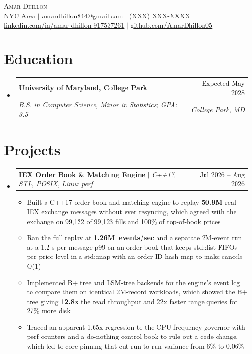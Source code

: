 \documentclass[letterpaper,10pt]{article}
\makeatletter
\newcommand{\resumeItem}[1]{\item{#1}\vspace{-1pt}}
\newcommand{\resumeSubheading}[4]{%
  \vspace{-1pt}\item
  \begin{tabular*}{\textwidth}[t]{l@{\extracolsep{\fill}}r}
    \textbf{#1} & #2 \\
    \textit{#3} & \textit{#4} \\
  \end{tabular*}\vspace{-6pt}%
}
\newcommand{\resumeProjectHeading}[2]{%
  \item
  \begin{tabular*}{\textwidth}{l@{\extracolsep{\fill}}r}
    #1 & #2 \\
  \end{tabular*}\vspace{-6pt}%
}
\newcommand{\resumeSubHeadingListStart}{\begin{itemize}[leftmargin=0in, label={}, itemsep=0pt, topsep=2pt]}
\newcommand{\resumeSubHeadingListEnd}{\end{itemize}}
\newcommand{\resumeItemListStart}{\begin{itemize}[leftmargin=0.18in, itemsep=0pt, topsep=1pt, parsep=0pt]}
\newcommand{\resumeItemListEnd}{\end{itemize}\vspace{0pt}}
\makeatother
\begin{document}
\begin{center}
  {\Huge\scshape\textcolor{accent}{Amar Dhillon}} \\ \vspace{3pt}
  \footnotesize
  NYC Area $|$
  \href{mailto:amardhillon844@gmail.com}{\underline{amardhillon844@gmail.com}} $|$
  (XXX) XXX-XXXX $|$
  \href{https://linkedin.com/in/amar-dhillon-917537261}{\underline{linkedin.com/in/amar-dhillon-917537261}} $|$
  \href{https://github.com/AmarDhillon05}{\underline{github.com/AmarDhillon05}}
\end{center}
\vspace{-6pt}

\section{Education}
\resumeSubHeadingListStart
  \resumeSubheading
    {University of Maryland, College Park}{Expected May 2028}
    {B.S. in Computer Science, Minor in Statistics; GPA: 3.5}{College Park, MD}
\resumeSubHeadingListEnd

\section{Projects}
\resumeSubHeadingListStart
  \resumeProjectHeading
    {\textbf{IEX Order Book \& Matching Engine} $|$ \textit{C++17, STL, POSIX, Linux perf}}{Jul 2026 -- Aug 2026}
  \resumeItemListStart
    \resumeItem{Built a C++17 order book and matching engine to replay \textbf{50.9M} real IEX exchange messages without ever resyncing, which agreed with the exchange on 99,122 of 99,123 fills and 100\% of top-of-book prices}
    \resumeItem{Ran the full replay at \mbox{\textbf{1.26M events/sec}} and a separate 2M-event run at a 1.2 \textmu{}s per-message p99 on an order book that keeps std::list FIFOs per price level in a std::map with an order-ID hash map to make cancels O(1)}
    \resumeItem{Implemented B+ tree and LSM-tree backends for the engine's event log to compare them on identical 2M-record workloads, which showed the B+ tree giving \textbf{12.8x} the read throughput and 22x faster range queries for 27\% more disk}
    \resumeItem{Traced an apparent 1.65x regression to the CPU frequency governor with perf counters and a do-nothing control book to rule out a code change, which led to core pinning that cut run-to-run variance from 6\% to 0.06\%}
  \resumeItemListEnd
\resumeSubHeadingListEnd
\end{document}
